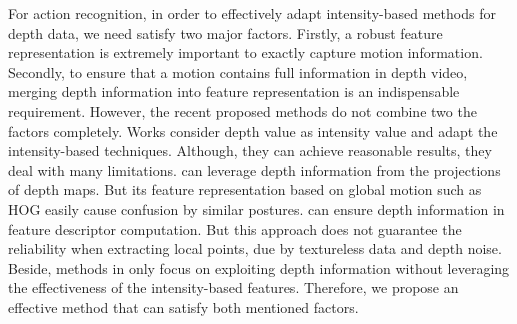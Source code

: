 \documentclass[review]{elsarticle}
\begin{document}
For action recognition, in order to effectively adapt intensity-based methods for depth data, we need satisfy two major factors. Firstly, a robust feature representation is extremely important to exactly capture motion information. Secondly, to ensure that a motion contains full information in depth video, merging depth information into feature representation is an indispensable requirement. However, the recent proposed methods do not combine two the factors completely. Works \cite{yang2012recognizing, xia2013spatio} consider depth value as intensity value and adapt the intensity-based techniques. Although, they can achieve reasonable results, they deal with many limitations. \cite{yang2012recognizing} can leverage depth information from the projections of depth maps. But its feature representation based on global motion such as HOG easily cause confusion by similar postures. \cite{xia2013spatio} can ensure depth information in feature descriptor computation. But this approach does not guarantee the reliability when extracting local points, due by textureless data and depth noise. Beside, methods in \cite{wang2012mining, oreifej2013hon4d} only focus on exploiting depth information without leveraging the effectiveness of the intensity-based features. Therefore, we propose an effective method that can satisfy both mentioned factors.
\end{document}
